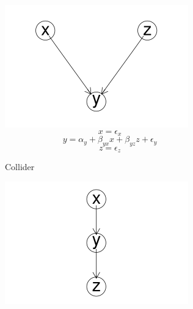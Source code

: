 \documentclass{article}
\begin{document}
\begin{figure}

  \centering
  \begin{subfigure}{0.3\textwidth}
    \centering
    \includegraphics[width=\linewidth]{images/collider.png} 
    \small
    \begin{equation*}
      x = \epsilon_{x}
    \end{equation*}
    \begin{equation*}
      y = \alpha_y + \beta_{yx} x + \beta_{yz} z + \epsilon_{y}
    \end{equation*}
    \begin{equation*}
      z = \epsilon_{z}
    \end{equation*}
    \caption{Collider}
    \label{collider}
  \end{subfigure}
  \begin{subfigure}{0.3\textwidth}
    \includegraphics[width=\linewidth]{images/chain.png}

\end{subfigure}
\end{figure}
\end{document}
